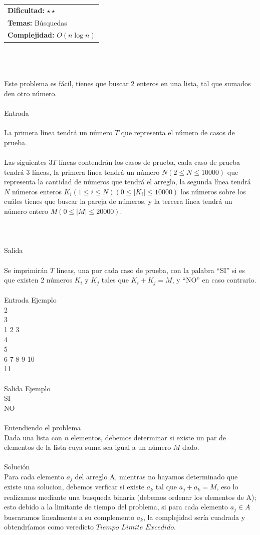 \documentclass[12pt]{article}
\begin{document}
\hfill
\begin{tabular}{@{}l@{}}
\textbf{Dificultad:} $\star\star$ \\
\textbf{Temas:} Búsquedas \\
\textbf{Complejidad:} $O(n \log n)$
\end{tabular}\\
\\
\\
Este problema es fácil, tienes que buscar 2 enteros en una lista, tal que sumados den otro número.\\
\\
\textrm{\large Entrada}
\\
\\La primera línea tendrá un número $T$ que representa el número de casos de prueba.\\
\\Las siguientes $3T$ líneas contendrán los casos de prueba, cada caso de prueba tendrá $3$ líneas, la primera línea tendrá un número $N (2 ≤ N ≤ 10000)$ que representa la cantidad de números que tendrá el arreglo, la segunda línea tendrá $N$ números enteros $K_i (1 ≤ i ≤ N) (0 ≤ |K_i| ≤ 10000)$ los números sobre los cuáles tienes que buscar la pareja de números, y la tercera línea tendrá un número entero $M (0 ≤ |M| ≤ 20000)$.\\
\\
\\
\\
\textrm{\large Salida}
\\
\\Se imprimirán $T$ líneas, una por cada caso de prueba, con la palabra “SI” si es que existen 2 números $K_i$ y $K_j$ tales que $K_i + K_j = M$, y “NO” en caso contrario.
\\
\\
\textrm{\large Entrada Ejemplo}
\\
2\\
3\\
1 2 3\\
4\\
5\\
6 7 8 9 10\\
11\\
\\
\textrm{\large Salida Ejemplo}
\\
SI\\
NO\\
\\
\textrm{\large Entendiendo el problema}\\
Dada una lista con $n$ elementos, debemos determinar si existe un par de elementos de la lista cuya suma sea igual a un número $M$ dado.\\
\\
\textrm{\large Solución}\\
Para cada elemento $a_j$ del arreglo A, mientras no hayamos determinado que existe una solucion, debemos verficar si existe $a_k$ tal que $a_j + a_k =M$, eso lo realizamos mediante una busqueda binaria (debemos ordenar los elementos de A); esto debido a la limitante de tiempo del problema, si para cada elemento $a_j \in A$ buscaramos linealmente a su complemento $a_k$, la complejidad sería cuadrada y obtendríamos como veredicto $Tiempo$ $Limite$ $Excedido$.
\end{document}
